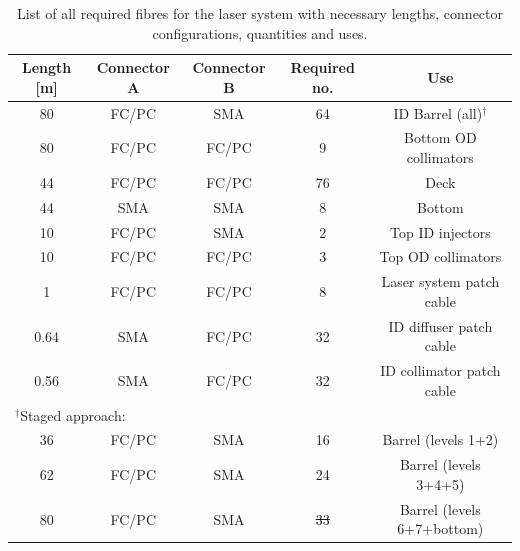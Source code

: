 \documentclass[a4paper,11pt]{article}
\providecommand{\DIFaddtex}[1]{{\protect\color{blue}\uwave{#1}}} %
\providecommand{\DIFdeltex}[1]{{\protect\color{red}\sout{#1}}}                      %
\providecommand{\DIFaddFL}[1]{\DIFadd{#1}} %
\providecommand{\DIFdelFL}[1]{\DIFdel{#1}} %
\providecommand{\DIFaddbeginFL}{} %
\providecommand{\DIFaddendFL}{} %
\providecommand{\DIFdelbeginFL}{} %
\providecommand{\DIFdelendFL}{} %
\providecommand{\DIFadd}[1]{\texorpdfstring{\DIFaddtex{#1}}{#1}} %
\providecommand{\DIFdel}[1]{\texorpdfstring{\DIFdeltex{#1}}{}} %
\newcommand{\DIFscaledelfig}{0.5}
\newlength{\DIFdelgraphicswidth} %
\newlength{\DIFdelgraphicsheight} %
\newcommand{\DIFaddincludegraphics}[2][]{{\color{blue}\fbox{\DIFOincludegraphics[#1]{#2}}}} %
\newcommand{\DIFdelincludegraphics}[2][]{%
\sbox{\DIFdelgraphicsbox}{\DIFOincludegraphics[#1]{#2}}%
\settoboxwidth{\DIFdelgraphicswidth}{\DIFdelgraphicsbox} %
\settoboxtotalheight{\DIFdelgraphicsheight}{\DIFdelgraphicsbox} %
\scalebox{\DIFscaledelfig}{%
\parbox[b]{\DIFdelgraphicswidth}{\usebox{\DIFdelgraphicsbox}\\[-\baselineskip] \rule{\DIFdelgraphicswidth}{0em}}\llap{\resizebox{\DIFdelgraphicswidth}{\DIFdelgraphicsheight}{%
\setlength{\unitlength}{\DIFdelgraphicswidth}%
\begin{picture}(1,1)%
\thicklines\linethickness{2pt} %
{\color[rgb]{1,0,0}\put(0,0){\framebox(1,1){}}}%
{\color[rgb]{1,0,0}\put(0,0){\line( 1,1){1}}}%
{\color[rgb]{1,0,0}\put(0,1){\line(1,-1){1}}}%
\end{picture}%
}\hspace*{3pt}}} %
} %
\DeclareRobustCommand{\DIFaddbeginFL}{\DIFOaddbeginFL \let\includegraphics\DIFaddincludegraphics} %
\DeclareRobustCommand{\DIFaddendFL}{\DIFOaddendFL \let\includegraphics\DIFOincludegraphics} %
\DeclareRobustCommand{\DIFdelbeginFL}{\DIFOdelbeginFL \let\includegraphics\DIFdelincludegraphics} %
\DeclareRobustCommand{\DIFdelendFL}{\DIFOaddendFL \let\includegraphics\DIFOincludegraphics} %
\begin{document}
\begin{table}[h]
\centering
\setlength{\tabcolsep}{4pt}
\begin{tabular}{ccccc}
\toprule
Length [m]	&	Connector A	&	Connector B	&	Required no.	&	Use		\\ \midrule
80			&	FC/PC		&	SMA			&	64				&	ID Barrel (all)$^\dagger$	\\
80			&	FC/PC		&	FC/PC		&	9				&	Bottom OD collimators \\
44			&	FC/PC		&	FC/PC		&	76				&	Deck	\\
44			&	SMA			&	SMA			&	8				&	Bottom	\\
10			&	FC/PC		&	SMA			&	2				&	Top ID injectors \\
10			&	FC/PC		&	FC/PC		&	3				&	Top OD collimators \\
1			&	FC/PC		&	FC/PC		&	8				&	Laser system patch cable \\
0.64		&	SMA			&	FC/PC		&	32				&	ID diffuser patch cable	\\
0.56		&	SMA			&	FC/PC		&	32				&	ID collimator patch cable	\\ \midrule
\multicolumn{3}{l}{$^\dagger$Staged approach:}			&					&			\\
36			&	FC/PC		&	SMA			&	16				&	Barrel (levels 1+2) \\
62			&	FC/PC		&	SMA			&	24				&	Barrel (levels 3+4+5)	\\
80			&	FC/PC		&	SMA			&	\DIFdelbeginFL \DIFdelFL{33				}\DIFdelendFL \DIFaddbeginFL \DIFaddFL{24				}\DIFaddendFL &	Barrel (levels 6+7+bottom)	\\
\bottomrule
\end{tabular}
\caption{List of all required fibres for the laser system with necessary lengths, connector configurations, quantities and uses.}\label{tab:fibreSummaryLaser}
\end{table}
\end{document}
